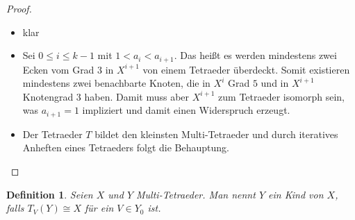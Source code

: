 \documentclass[12pt,titlepage,twoside,cleardoublepage]{article}
\theoremstyle{nummermitklammern}
\newtheorem{definition}[temp]{Definition}
\newtheorem{definition}[zahl]{Definition}
\numberwithin{equation}{section}
\begin{document}
\begin{proof}
\begin{itemize}
\item klar
\item Sei $0\leq i \leq k-1$ mit $1<a_i <a_{i+1}.$ Das heißt es werden mindestens zwei Ecken vom Grad 3 in $X^{i+1}$ von einem Tetraeder überdeckt. Somit existieren mindestens zwei benachbarte Knoten, die in $X^i$ Grad $5$ und in $X^{i+1}$ Knotengrad $3$ haben. Damit muss aber $X^{i+1}$ zum Tetraeder isomorph sein, was $a_{i+1}=1$ impliziert und damit einen Widerspruch erzeugt.
 \item Der Tetraeder $T$ bildet den kleinsten Multi-Tetraeder  und durch iteratives Anheften eines Tetraeders folgt die Behauptung.
\end{itemize}
\end{proof}
\begin{definition}
Seien $X$ und $Y$ Multi-Tetraeder. Man nennt $Y$ ein Kind von $X$, falls $T_V(Y)\cong X$ für ein $V\in Y_0$ ist.
\end{definition}
\end{document}
